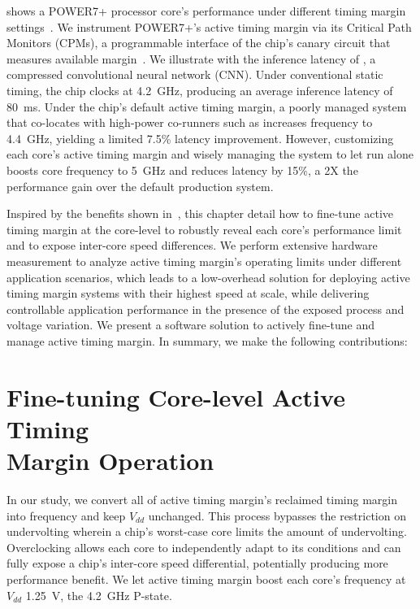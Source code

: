  shows a POWER7+ processor core's performance under different timing margin settings~\cite{sinharoy2011power7, floyd2011introducing}. We instrument POWER7+'s active timing margin via its Critical Path Monitors (CPMs), a programmable interface of the chip's canary circuit that measures available margin~\cite{lefurgy2011active, drake2013single}. We illustrate with the inference latency of , a compressed convolutional neural network (CNN). Under conventional static timing, the chip clocks at 4.2~GHz, producing an average inference latency of 80~ms. Under the chip's default active timing margin, a poorly managed system that co-locates  with high-power co-runners such as  increases frequency to 4.4~GHz, yielding a limited 7.5\% latency improvement. However, customizing each core's active timing margin and wisely managing the system to let  run alone boosts core frequency to 5~GHz and reduces latency by 15\%, a 2X the performance gain over the default production system.

Inspired by the benefits shown in~, this chapter detail how to fine-tune active timing margin at the core-level to robustly reveal each core's performance limit and to expose inter-core speed differences. We perform extensive hardware measurement to analyze active timing margin's operating limits under different application scenarios, which leads to a low-overhead solution for deploying active timing margin systems with their highest speed at scale, while delivering controllable application performance in the presence of the exposed process and voltage variation. We present a software solution to actively fine-tune and manage active timing margin. In summary, we make the following contributions:

\section{Fine-tuning Core-level Active Timing\\ Margin Operation}
\label{sec:process:configurability}

In our study, we convert all of active timing margin's reclaimed timing margin into frequency and keep $V_{dd}$ unchanged. This process bypasses the restriction on undervolting wherein a chip's worst-case core limits the amount of undervolting. Overclocking allows each core to independently adapt to its conditions and can fully expose a chip's inter-core speed differential, potentially producing more performance benefit. We let active timing margin boost each core's frequency at $V_{dd}$ 1.25~V, the 4.2~GHz P-state.

